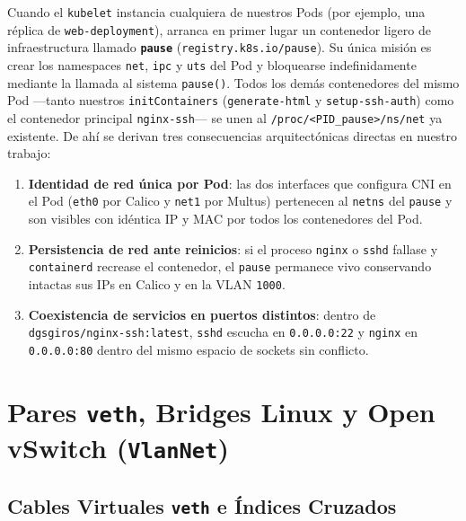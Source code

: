 Cuando el \texttt{kubelet} instancia cualquiera de nuestros Pods (por ejemplo, una réplica de \texttt{web-deployment}), arranca en primer lugar un contenedor ligero de infraestructura llamado \textbf{\texttt{pause}} (\texttt{registry.k8s.io/pause}). Su única misión es crear los namespaces \texttt{net}, \texttt{ipc} y \texttt{uts} del Pod y bloquearse indefinidamente mediante la llamada al sistema \texttt{pause()}. Todos los demás contenedores del mismo Pod ---tanto nuestros \texttt{initContainers} (\texttt{generate-html} y \texttt{setup-ssh-auth}) como el contenedor principal \texttt{nginx-ssh}--- se unen al \texttt{/proc/<PID\_pause>/ns/net} ya existente. De ahí se derivan tres consecuencias arquitectónicas directas en nuestro trabajo:
\begin{enumerate}
  \item \textbf{Identidad de red única por Pod}: las dos interfaces que configura CNI en el Pod (\texttt{eth0} por Calico y \texttt{net1} por Multus) pertenecen al \texttt{netns} del \texttt{pause} y son visibles con idéntica IP y MAC por todos los contenedores del Pod.
  \item \textbf{Persistencia de red ante reinicios}: si el proceso \texttt{nginx} o \texttt{sshd} fallase y \texttt{containerd} recrease el contenedor, el \texttt{pause} permanece vivo conservando intactas sus IPs en Calico y en la VLAN \texttt{1000}.
  \item \textbf{Coexistencia de servicios en puertos distintos}: dentro de \texttt{dgsgiros/nginx-ssh:latest}, \texttt{sshd} escucha en \texttt{0.0.0.0:22} y \texttt{nginx} en \texttt{0.0.0.0:80} dentro del mismo espacio de sockets sin conflicto.
\end{enumerate}

\section{Pares \texttt{veth}, Bridges Linux y Open vSwitch (\texttt{VlanNet})}

\subsection{Cables Virtuales \texttt{veth} e Índices Cruzados}

